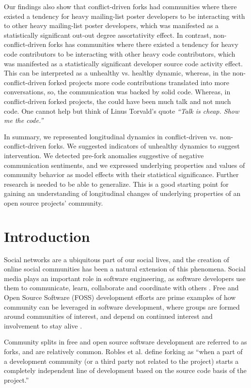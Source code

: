\documentclass[12pt]{report}
\begin{document}
Our findings also show that conflict-driven forks had communities where there existed a tendency for heavy mailing-list poster developers to be interacting with to other heavy mailing-list poster developers, which was manifested as a statistically significant out-out degree assortativity effect. In contrast, non-conflict-driven forks has communities where there existed a tendency for heavy code contributors to be interacting with other heavy code contributors, which was manifested as a statistically significant developer source code activity effect. This can be interpreted as a unhealthy vs. healthy dynamic, whereas, in the non-conflict-driven forked projects more code contributions translated into more conversations, so, the communication was backed by solid code. Whereas, in conflict-driven forked projects, the could have been much talk and not much code. One cannot help but think of Linus Torvald's quote \textit{``Talk is cheap. Show me the code.''}

In summary, we represented longitudinal dynamics in conflict-driven vs. non-conflict-driven forks. We suggested indicators of unhealthy dynamics to suggest intervention. We detected pre-fork anomalies suggestive of negative communication sentiments, and we expressed underlying properties and values of community behavior as model effects with their statistical significance. Further research is needed to be able to generalize. This is a good starting point for gaining an understanding of longitudinal changes of underlying properties of an open source projects' community.

\pagebreak

\section{Introduction}
\label{introduction}
Social networks are a ubiquitous part of our social lives, and the creation of online social communities has been a natural extension of this phenomena. Social media plays an important role in software engineering, as software developers use them to communicate, learn, collaborate and coordinate with others \cite{Storey}. Free and Open Source Software (FOSS) development efforts are prime examples of how community can be leveraged in software development, where groups are formed around communities of interest, and depend on continued interest and involvement to stay alive \cite{NymanCodeForking}.

Community splits in free and open source software development are referred to as forks, and are relatively common. Robles et al. \cite{Robles} define forking as ``when a part of a development community (or a third party not related to the project) starts a completely independent line of development based on the source code basis of the project.'' 
\end{document}
